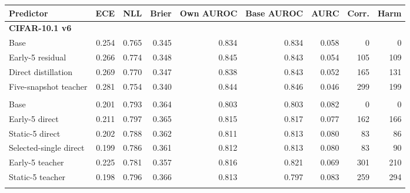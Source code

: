 \begin{tabular}{lrrrrrrrr}
\toprule
Predictor & ECE & NLL & Brier & Own AUROC & Base AUROC & AURC & Corr. & Harm \\
\midrule
\multicolumn{9}{l}{\textbf{CIFAR-10.1 v6}} \\
Base & 0.254 & 0.765 & 0.345 & 0.834 & 0.834 & 0.058 & 0 & 0 \\
Early-5 residual & 0.266 & 0.774 & 0.348 & 0.845 & 0.843 & 0.054 & 105 & 109 \\
Direct distillation & 0.269 & 0.770 & 0.347 & 0.838 & 0.843 & 0.052 & 165 & 131 \\
Five-snapshot teacher & 0.281 & 0.754 & 0.340 & 0.844 & 0.846 & 0.046 & 299 & 199 \\
\addlinespace
\multicolumn{9}{l}{\textbf{CIFAR-10.2}} \\
Base & 0.201 & 0.793 & 0.364 & 0.803 & 0.803 & 0.082 & 0 & 0 \\
Early-5 direct & 0.211 & 0.797 & 0.365 & 0.815 & 0.817 & 0.077 & 162 & 166 \\
Static-5 direct & 0.202 & 0.788 & 0.362 & 0.811 & 0.813 & 0.080 & 83 & 86 \\
Selected-single direct & 0.199 & 0.786 & 0.361 & 0.812 & 0.813 & 0.080 & 83 & 90 \\
Early-5 teacher & 0.225 & 0.781 & 0.357 & 0.816 & 0.821 & 0.069 & 301 & 210 \\
Static-5 teacher & 0.198 & 0.796 & 0.366 & 0.813 & 0.797 & 0.083 & 259 & 294 \\
\addlinespace
\bottomrule
\end{tabular}
